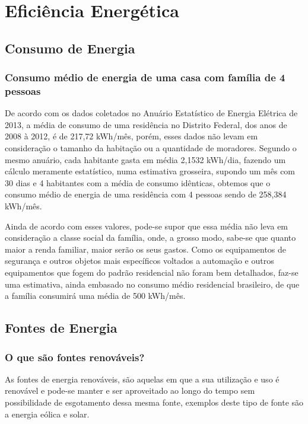\chapter{Eficiência Energética}
\section{Consumo de Energia}
\subsection{Consumo médio de energia de uma casa com família de 4 pessoas}

	De acordo com os dados coletados no Anuário Estatístico de Energia Elétrica de 2013, a média de consumo de uma residência no Distrito Federal, dos anos de 2008 à 2012, é de 217,72 kWh/mês, porém, esses dados não levam em consideração o tamanho da habitação ou a quantidade de moradores. Segundo o mesmo anuário, cada habitante gasta em média 2,1532 kWh/dia, fazendo um cálculo meramente estatístico, numa estimativa grosseira, supondo um mês com 30 dias e 4 habitantes com a média de consumo idênticas, obtemos que o consumo médio de energia de uma residência com 4 pessoas sendo de 258,384 kWh/mês. 

	Ainda de acordo com esses valores, pode-se supor que essa média não leva em consideração a classe social da família, onde, a grosso modo, sabe-se que quanto maior a renda familiar, maior serão os seus gastos. Como os equipamentos de segurança e outros objetos mais específicos voltados a automação e outros equipamentos que fogem do padrão residencial não foram bem detalhados, faz-se uma estimativa, ainda embasado no consumo médio residencial brasileiro, de que a família consumirá uma média de 500 kWh/mês.\cite{epeanuario}


\section{Fontes de Energia}

\subsection{O que são fontes renováveis?}

	As fontes de energia renováveis, são aquelas em que a sua utilização e uso 
é renovável e pode-se manter e ser aproveitado ao longo do tempo sem 
possibilidade de esgotamento dessa mesma fonte, exemplos deste tipo de 
fonte são a energia eólica e solar.\cite{suapesquisaenergiarenovavel}

